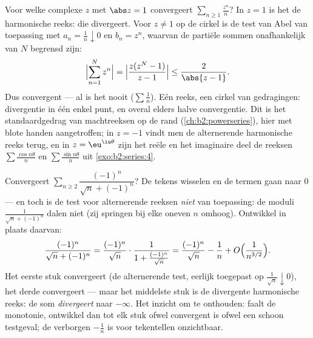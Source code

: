 \begin{example}\label{ex:b2:series:abelboundary}
Voor welke complexe $z$ met $\abs z = 1$ convergeert $\sum_{n \geq
1} \frac{z^n}{n}$? In $z = 1$ is het de harmonische reeks: die
divergeert. Voor $z \neq 1$ op de cirkel is de test van Abel van
toepassing met $a_n = \frac1n \downarrow 0$ en $b_n = z^n$,
waarvan de partiële sommen onafhankelijk van $N$ begrensd zijn:
\[
\Bigl|\sum_{n=1}^{N} z^n\Bigr|
= \Bigl|\frac{z(z^N - 1)}{z - 1}\Bigr|
\leq \frac{2}{\abs{z - 1}} .
\]
Dus convergent --- al is het nooit  ($\sum\frac1n$). Eén
reeks, een cirkel van gedragingen: divergentie in één enkel punt,
en overal elders halve convergentie. Dit is het standaardgedrag van
machtreeksen op de rand (\cref{ch:b2:powerseries}), hier met blote
handen aangetroffen; in $z = -1$ vindt men de alternerende
harmonische reeks terug, en in $z = \eu^{\iu\theta}$ zijn het
reële en het imaginaire deel de reeksen $\sum\frac{\cos
n\theta}{n}$ en $\sum\frac{\sin n\theta}{n}$ uit
\cref{exo:b2:series:4}.
\end{example}

\begin{example}\label{ex:b2:series:trap}
Convergeert $\sum_{n\geq2} \dfrac{(-1)^n}{\sqrt n + (-1)^n}$? De
tekens wisselen en de termen gaan naar $0$ --- en toch is de test
voor alternerende reeksen \emph{niet} van toepassing: de moduli
$\frac{1}{\sqrt n + (-1)^n}$ dalen niet (zij springen bij elke
oneven $n$ omhoog). Ontwikkel in plaats daarvan:
\[
\frac{(-1)^n}{\sqrt n + (-1)^n}
= \frac{(-1)^n}{\sqrt n}\cdot
\frac{1}{1 + \frac{(-1)^n}{\sqrt n}}
= \frac{(-1)^n}{\sqrt n} - \frac{1}{n}
+ O\Bigl(\frac{1}{n^{3/2}}\Bigr).
\]
Het eerste stuk convergeert (de alternerende test, eerlijk
toegepast op $\frac1{\sqrt n}\downarrow0$), het derde convergeert
 --- maar het middelste stuk is de divergente harmonische
reeks: de som \emph{divergeert} naar $-\infty$. Het inzicht om te
onthouden: faalt de monotonie, ontwikkel dan tot elk stuk ofwel
 convergent is ofwel een schoon testgeval; de verborgen
$-\frac1n$ is voor tekentellen onzichtbaar.
\end{example}

